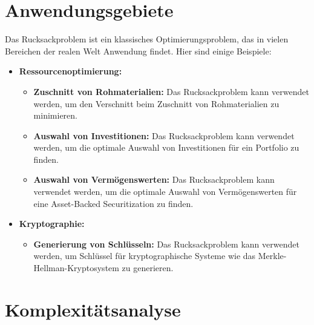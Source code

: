 \documentclass[12pt]{report}
\begin{document}
\section{Anwendungsgebiete}
Das Rucksackproblem ist ein klassisches Optimierungsproblem, das in vielen Bereichen der realen Welt Anwendung findet. Hier sind einige Beispiele:

\begin{itemize}
	\item \textbf{Ressourcenoptimierung:}
	\begin{itemize}
		\item \textbf{Zuschnitt von Rohmaterialien:} Das Rucksackproblem kann verwendet werden, um den Verschnitt beim Zuschnitt von Rohmaterialien zu minimieren.\cite{kellerer2004knapsack} 
		\item \textbf{Auswahl von Investitionen:} Das Rucksackproblem kann verwendet werden, um die optimale Auswahl von Investitionen für ein Portfolio zu finden.\cite{kellerer2004knapsack}
		\item \textbf{Auswahl von Vermögenswerten:} Das Rucksackproblem kann verwendet werden, um die optimale Auswahl von Vermögenswerten für eine Asset-Backed Securitization zu finden.\cite{kellerer2004knapsack}
	\end{itemize}
	\item \textbf{Kryptographie:}
	\begin{itemize}
		\item \textbf{Generierung von Schlüsseln:} Das Rucksackproblem kann verwendet werden, um Schlüssel für kryptographische Systeme wie das Merkle-Hellman-Kryptosystem zu generieren.\cite{kellerer2004knapsack}
	\end{itemize}
\end{itemize}

\section{Komplexitätsanalyse}

\cite{martello1987algorithms}

\end{document}
